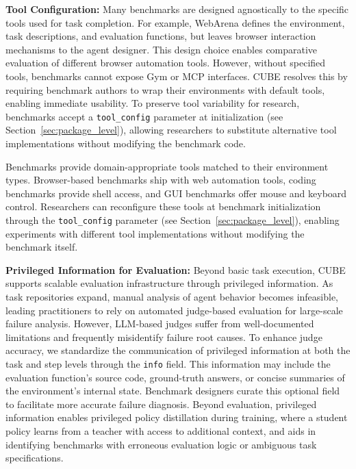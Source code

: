 \documentclass{article}
\theoremstyle{plain}
\theoremstyle{definition}
\theoremstyle{remark}
\begin{document}
\textbf{Tool Configuration:} Many benchmarks are designed agnostically to the specific tools used for task completion. For example, WebArena \citep{zhou2024webarena} defines the environment, task descriptions, and evaluation functions, but leaves browser interaction mechanisms to the agent designer. This design choice enables comparative evaluation of different browser automation tools. However, without specified tools, benchmarks cannot expose Gym or MCP interfaces. CUBE resolves this by requiring benchmark authors to wrap their environments with default tools, enabling immediate usability. To preserve tool variability for research, benchmarks accept a \texttt{tool\_config} parameter at initialization (see Section~\ref{sec:package_level}), allowing researchers to substitute alternative tool implementations without modifying the benchmark code.

Benchmarks provide domain-appropriate tools matched to their environment types. Browser-based benchmarks ship with web automation tools, coding benchmarks provide shell access, and GUI benchmarks offer mouse and keyboard control. Researchers can reconfigure these tools at benchmark initialization through the \texttt{tool\_config} parameter (see Section~\ref{sec:package_level}), enabling experiments with different tool implementations without modifying the benchmark itself.

\textbf{Privileged Information for Evaluation:} Beyond basic task execution, CUBE supports scalable evaluation infrastructure through privileged information. As task repositories expand, manual analysis of agent behavior becomes infeasible, leading practitioners to rely on automated judge-based evaluation for large-scale failure analysis. However, LLM-based judges suffer from well-documented limitations \citep{lu2025agentrewardbench} and frequently misidentify failure root causes. To enhance judge accuracy, we standardize the communication of privileged information at both the task and step levels through the \texttt{info} field. This information may include the evaluation function's source code, ground-truth answers, or concise summaries of the environment's internal state. Benchmark designers curate this optional field to facilitate more accurate failure diagnosis. Beyond evaluation, privileged information enables privileged policy distillation during training, where a student policy learns from a teacher with access to additional context, and aids in identifying benchmarks with erroneous evaluation logic or ambiguous task specifications.
\end{document}
